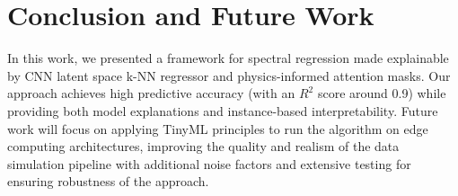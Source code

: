 \documentclass[11pt,twoside]{article}
\begin{document}
\section{Conclusion and Future Work}
In this work, we presented a framework for spectral regression made explainable by CNN latent space k-NN regressor and physics-informed attention masks. Our approach achieves high predictive accuracy (with an $R^2$ score around 0.9) while providing both model explanations and instance-based interpretability. Future work will focus on applying TinyML principles to run the algorithm on edge computing architectures, improving the quality and realism of the data simulation pipeline with additional noise factors and extensive testing for ensuring robustness of the approach.




\end{document}
